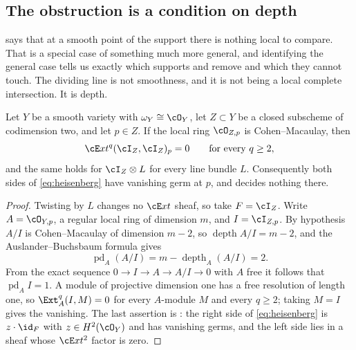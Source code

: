 \subsection{The obstruction is a condition on depth}
\label{ssec:depth}

 says that at a smooth point of the support there is
nothing local to compare. That is a special case of something much more
general, and identifying the general case tells us exactly which supports
 and  remove and which
they cannot touch. The dividing line is not smoothness, and it is not being a
local complete intersection. It is depth.

\begin{theorem}%
\label{thm:cmvanishing}
Let $Y$ be a smooth variety with $\omega_{Y}\cong\cO_{Y}$, let $Z\subset Y$ be
a closed subscheme of codimension two, and let $p\in Z$. If the local ring
$\cO_{Z,p}$ is Cohen--Macaulay, then
\[
  \cE xt^{q}(\cI_{Z},\cI_{Z})_{p}=0\qquad\text{for every }q\ge2 ,
\]
and the same holds for $\cI_{Z}\otimes L$ for every line bundle $L$.
Consequently both sides of \eqref{eq:heisenberg} have vanishing germ at $p$,
and  decides nothing there.
\end{theorem}

\begin{proof}
Twisting by $L$ changes no $\cE xt$ sheaf, so take $F=\cI_{Z}$. Write
$A=\cO_{Y,p}$, a regular local ring of dimension $m$, and $I=\cI_{Z,p}$. By
hypothesis $A/I$ is Cohen--Macaulay of dimension $m-2$, so
$\operatorname{depth}A/I=m-2$, and the Auslander--Buchsbaum formula gives
\[
  \operatorname{pd}_{A}(A/I)=m-\operatorname{depth}_{A}(A/I)=2 .
\]
From the exact sequence $0\to I\to A\to A/I\to0$ with $A$ free it follows that
$\operatorname{pd}_{A}I=1$. A module of projective dimension one has a free
resolution of length one, so $\Ext^{q}_{A}(I,M)=0$ for every $A$-module $M$
and every $q\ge2$; taking $M=I$ gives the vanishing. The last assertion is
: the right side of \eqref{eq:heisenberg} is
$z\cdot\id_{F}$ with $z\in H^{2}(\cO_{Y})$ and has vanishing germs, and the
left side lies in a sheaf whose $\cE xt^{2}$ factor is zero.
\end{proof}

